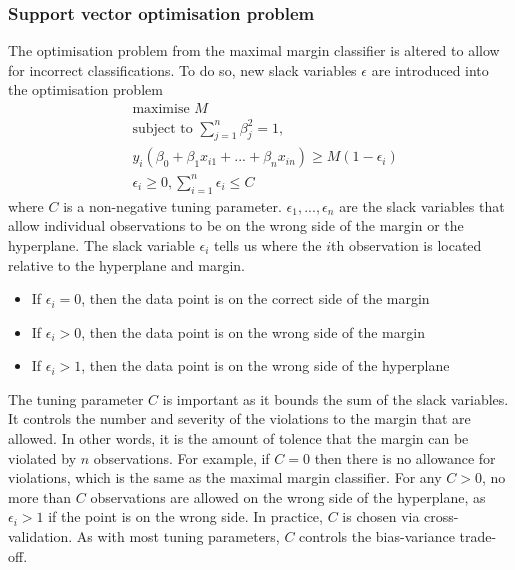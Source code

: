 \documentclass[CS5104-Notes.tex]{subfiles}
\begin{document}
\subsubsection{Support vector optimisation problem}
The optimisation problem from the maximal margin classifier is altered to allow for incorrect classifications. To do so, new slack variables $\epsilon$ are introduced into the optimisation problem
\begin{align}
  &\text{maximise } M \\
  &\text{subject to } \sum_{j=1}^{n}\beta_{j}^{2} = 1, \\
  &y_{i}(\beta_{0} + \beta_{1}x_{i1} + ... + \beta_{n}x_{in}) \geq M(1 - \epsilon_{i}) \\
  &\epsilon_{i} \geq 0, \sum_{i=1}^{n}\epsilon_{i} \leq C
\end{align}
where $C$ is a non-negative tuning parameter. $\epsilon_{1},...,\epsilon_{n}$ are the slack variables that allow individual observations to be on the wrong side of the margin or the hyperplane. The slack variable $\epsilon_{i}$ tells us where the $i$th observation is located relative to the hyperplane and margin.
\begin{itemize}
\item If $\epsilon_{i} = 0$, then the data point is on the correct side of the margin
\item If $\epsilon_{i} > 0$, then the data point is on the wrong side of the margin
\item If $\epsilon_{i} > 1$, then the data point is on the wrong side of the hyperplane
\end{itemize}
The tuning parameter $C$ is important as it bounds the sum of the slack variables. It controls the number and severity of the violations to the margin that are allowed. In other words, it is the amount of tolence that the margin can be violated by $n$ observations. For example, if $C = 0$ then there is no allowance for violations, which is the same as the maximal margin classifier. For any $C > 0$, no more than $C$ observations are allowed on the wrong side of the hyperplane, as $\epsilon_{i} > 1$ if the point is on the wrong side. In practice, $C$ is chosen via cross-validation. As with most tuning parameters, $C$ controls the bias-variance trade-off.
\end{document}
